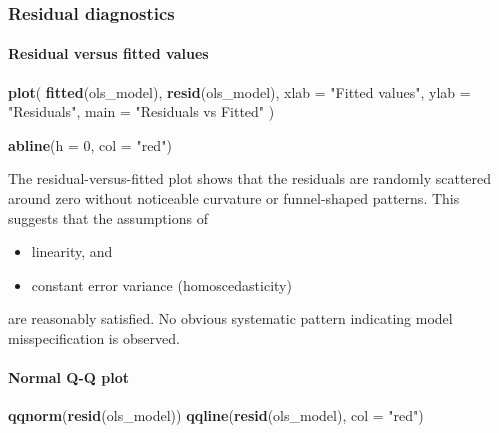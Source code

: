 \documentclass[
  11pt,
]{article}
\newenvironment{Shaded}{\begin{snugshade}}{\end{snugshade}}
\newcommand{\AttributeTok}[1]{\textcolor[rgb]{0.13,0.29,0.53}{#1}}
\newcommand{\DecValTok}[1]{\textcolor[rgb]{0.00,0.00,0.81}{#1}}
\newcommand{\FunctionTok}[1]{\textcolor[rgb]{0.13,0.29,0.53}{\textbf{#1}}}
\newcommand{\NormalTok}[1]{#1}
\newcommand{\StringTok}[1]{\textcolor[rgb]{0.31,0.60,0.02}{#1}}
\providecommand{\tightlist}{%
  \setlength{\itemsep}{0pt}\setlength{\parskip}{0pt}}
\begin{document}
\subsubsection{Residual diagnostics}\label{residual-diagnostics}

\paragraph{Residual versus fitted
values}\label{residual-versus-fitted-values}

\begin{Shaded}
\begin{Highlighting}[]
\FunctionTok{plot}\NormalTok{(}
  \FunctionTok{fitted}\NormalTok{(ols\_model),}
  \FunctionTok{resid}\NormalTok{(ols\_model),}
  \AttributeTok{xlab =} \StringTok{"Fitted values"}\NormalTok{,}
  \AttributeTok{ylab =} \StringTok{"Residuals"}\NormalTok{,}
  \AttributeTok{main =} \StringTok{"Residuals vs Fitted"}
\NormalTok{)}

\FunctionTok{abline}\NormalTok{(}\AttributeTok{h =} \DecValTok{0}\NormalTok{, }\AttributeTok{col =} \StringTok{"red"}\NormalTok{)}
\end{Highlighting}
\end{Shaded}

The residual-versus-fitted plot shows that the residuals are randomly
scattered around zero without noticeable curvature or funnel-shaped
patterns. This suggests that the assumptions of

\begin{itemize}
\tightlist
\item
  linearity, and
\item
  constant error variance (homoscedasticity)
\end{itemize}

are reasonably satisfied. No obvious systematic pattern indicating model
misspecification is observed.

\paragraph{Normal Q-Q plot}\label{normal-q-q-plot}

\begin{Shaded}
\begin{Highlighting}[]
\FunctionTok{qqnorm}\NormalTok{(}\FunctionTok{resid}\NormalTok{(ols\_model))}
\FunctionTok{qqline}\NormalTok{(}\FunctionTok{resid}\NormalTok{(ols\_model), }\AttributeTok{col =} \StringTok{"red"}\NormalTok{)}
\end{Highlighting}
\end{Shaded}
\end{document}
